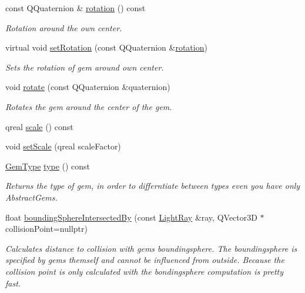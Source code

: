\begin{DoxyCompactItemize}
const Q\+Quaternion \& \hyperlink{class_abstract_gem_a4fc9d6ed418b73ec2539e063ebfa70c1}{rotation} () const 
\begin{DoxyCompactList}\small\item\em Rotation around the own center. \end{DoxyCompactList}\item 
virtual void \hyperlink{class_abstract_gem_afce4d09f74fec117d27b11a220eee6b9}{set\+Rotation} (const Q\+Quaternion \&\hyperlink{class_abstract_gem_a6d85928549d64d369864716dbe2c716b}{rotation})
\begin{DoxyCompactList}\small\item\em Sets the rotation of gem around own center. \end{DoxyCompactList}\item 
void \hyperlink{class_abstract_gem_a5ca6867a835dfe2b49d46dbfb933bfca}{rotate} (const Q\+Quaternion \&quaternion)
\begin{DoxyCompactList}\small\item\em Rotates the gem around the center of the gem. \end{DoxyCompactList}\item 
qreal \hyperlink{class_abstract_gem_aadc1c5925331b573d9aba6c2451c9348}{scale} () const 
\item 
void \hyperlink{class_abstract_gem_a23693f4ebb5260cb21141bbcf3f4ff83}{set\+Scale} (qreal scale\+Factor)
\item 
\hyperlink{abstractgem_8h_a2f0a34b6dac35a9610cab7a1c5fcb444}{Gem\+Type} \hyperlink{class_abstract_gem_a4860dda50d7acab4f507505369da19f8}{type} () const 
\begin{DoxyCompactList}\small\item\em Returns the type of gem, in order to differntiate between types even you have only Abstract\+Gems. \end{DoxyCompactList}\item 
float \hyperlink{class_abstract_gem_a9f945c4f1b76ae90414ed3229d01dd0b}{bounding\+Sphere\+Intersected\+By} (const \hyperlink{class_light_ray}{Light\+Ray} \&ray, Q\+Vector3\+D $\ast$collision\+Point=nullptr)
\begin{DoxyCompactList}\small\item\em Calculates distance to collision with gems boundingsphere.  The boundingsphere is specified by gems themself and cannot be influenced from outside. Because the collision point is only calculated with the bondingsphere computation is pretty fast. \end{DoxyCompactList}\item 

\end{DoxyCompactItemize}
